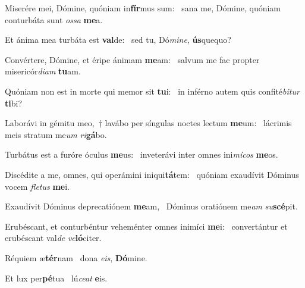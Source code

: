 \item Miserére mei, Dómine, quóniam in\textbf{fír}mus sum:~\psstar{} sana me, Dómine, quóniam conturbáta sunt \textit{os}\textit{sa} \textbf{me}a.

\item Et ánima mea turbáta est \textbf{val}de:~\psstar{} sed tu, Dó\textit{mi}\textit{ne}, \textbf{ús}quequo?

\item Convértere, Dómine, et éripe ánimam \textbf{me}am:~\psstar{} salvum me fac propter misericór\textit{di}\textit{am} \textbf{tu}am.

\item Quóniam non est in morte qui memor sit \textbf{tu}i:~\psstar{} in inférno autem quis confité\textit{bi}\textit{tur} \textbf{ti}bi?

\item Laborávi in gémitu meo,~† lavábo per síngulas noctes lectum \textbf{me}um:~\psstar{} lácrimis meis stratum me\textit{um} \textit{ri}\textbf{gá}bo.

\item Turbátus est a furóre óculus \textbf{me}us:~\psstar{} inveterávi inter omnes ini\textit{mí}\textit{cos} \textbf{me}os.

\item Discédite a me, omnes, qui operámini iniqui\textbf{tá}tem:~\psstar{} quóniam exaudívit Dóminus vocem \textit{fle}\textit{tus} \textbf{me}i.

\item Exaudívit Dóminus deprecatiónem \textbf{me}am,~\psstar{} Dóminus oratiónem me\textit{am} \textit{su}\textbf{scé}pit.

\item Erubéscant, et conturbéntur veheménter omnes inimíci \textbf{me}i:~\psstar{} convertántur et erubéscant val\textit{de} \textit{ve}\textbf{ló}citer.

\item Réquiem æ\textbf{tér}nam~\psstar{} dona \textit{e}\textit{is}, \textbf{Dó}mine.

\item Et lux per\textbf{pé}tua~\psstar{} lú\textit{ce}\textit{at} \textbf{e}is.
